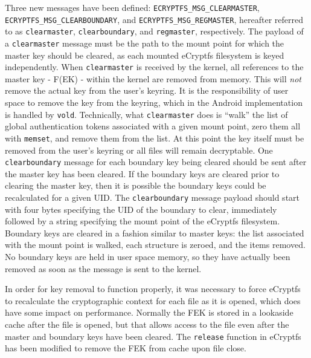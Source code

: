 Three new messages have been defined: \texttt{ECRYPTFS\_MSG\_CLEARMASTER}, \texttt{ECRYPTFS\_MSG\_CLEARBOUNDARY}, and
\texttt{ECRYPTFS\_MSG\_REGMASTER}, hereafter referred to as \texttt{clearmaster}, \texttt{clearboundary}, and \texttt{regmaster},
respectively. The payload of a \texttt{clearmaster} message must be the path to the mount point for which the master key should be
cleared, as each mounted eCryptfs filesystem is keyed independently. When \texttt{clearmaster} is received by the kernel, all
references to the master key - F(EK) - within the kernel are removed from memory. This will \emph{not} remove the
actual key from the user's keyring. It is the responsibility of user space to remove the key from the keyring, which in the Android
implementation is handled by \texttt{vold}.  Technically, what \texttt{clearmaster} does is ``walk'' the list of global
authentication tokens associated with a given mount point, zero them all with \texttt{memset}, and remove them from the list.  At
this point the key itself must be removed from the user's keyring or all files will remain decryptable. One \texttt{clearboundary}
message for each boundary key being cleared should be sent after the master key has been cleared. If the boundary keys are cleared
prior to clearing the master key, then it is possible the boundary keys could be recalculated for a given UID. The
\texttt{clearboundary} message payload should start with four bytes specifying the UID of the boundary to clear, immediately
followed by a string specifying the mount point of the eCryptfs filesystem. Boundary keys are cleared in a fashion similar to master
keys: the list associated with the mount point is walked, each structure is zeroed, and the items removed.  No boundary keys are
held in user space memory, so they have actually been removed as soon as the message is sent to the kernel. 

In order for key removal to function properly, it was necessary to force eCryptfs to recalculate the cryptographic context for
each file as it is opened, which does have some impact on performance. Normally the FEK is stored in a lookaside cache after the
file is opened, but that allows access to the file even after the master and boundary keys have been cleared. The \texttt{release}
function in eCryptfs has been modified to remove the FEK from cache upon file close.


